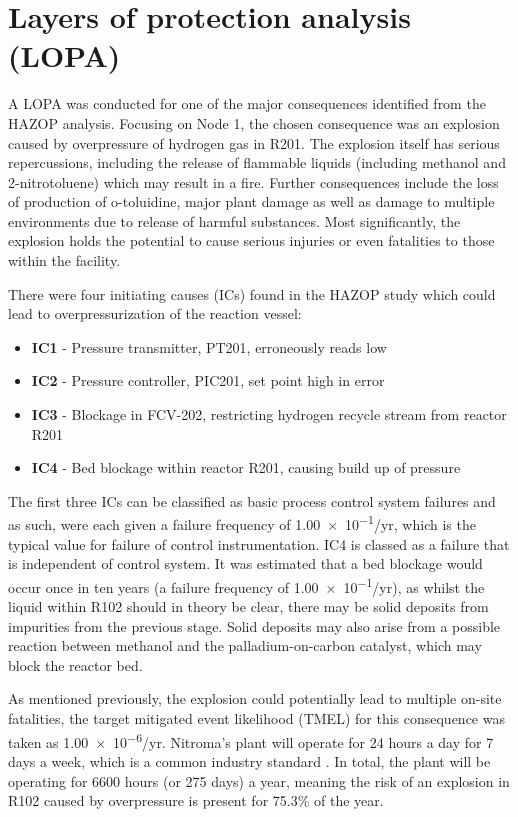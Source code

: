 \section{Layers of protection analysis (LOPA)}
\label{sec:LOPA}

A LOPA was conducted for one of the major consequences identified from the HAZOP analysis. Focusing on Node 1, the chosen consequence was an explosion caused by overpressure of hydrogen gas in R201. The explosion itself has serious repercussions, including the release of flammable liquids (including methanol and 2-nitrotoluene) which may result in a fire. Further consequences include the loss of production of o-toluidine, major plant damage as well as damage to multiple environments due to release of harmful substances. Most significantly, the explosion holds the potential to cause serious injuries or even fatalities to those within the facility. 

There were four initiating causes (ICs) found in the HAZOP study which could lead to overpressurization of the reaction vessel:

\begin{itemize}
\item \textbf{IC1} - Pressure transmitter, PT201, erroneously reads low 
\item \textbf{IC2} -  Pressure controller, PIC201, set point high in error
\item \textbf{IC3 }- Blockage in FCV-202, restricting hydrogen recycle stream from reactor R201 
\item \textbf{IC4} - Bed blockage within reactor R201, causing build up of pressure 
\end{itemize}

The first three ICs can be classified as basic process control system failures and as such, were each given a failure frequency of \num{1.00e-1}/yr, which is the typical value for failure of control instrumentation. IC4 is classed as a failure that is independent of control system. It was estimated that a bed blockage would occur once in ten years (a failure frequency of \num{1.00e-1}/yr), as whilst the liquid within R102 should in theory be clear, there may be solid deposits from impurities from the previous stage. Solid deposits may also arise from a possible reaction between methanol and the palladium-on-carbon catalyst, which may block the reactor bed. 

As mentioned previously, the explosion could potentially lead to multiple on-site fatalities, the target mitigated event likelihood (TMEL) for this consequence was taken as \num{1.00e-6}/yr. Nitroma's plant will operate for 24 hours a day for 7 days a week, which is a common industry standard \cite{job_guide_chemical_2021}. In total, the plant will be operating for 6600 hours (or 275 days) a year, meaning the risk of an explosion in R102 caused by overpressure is present for 75.3\% of the year.  
 

